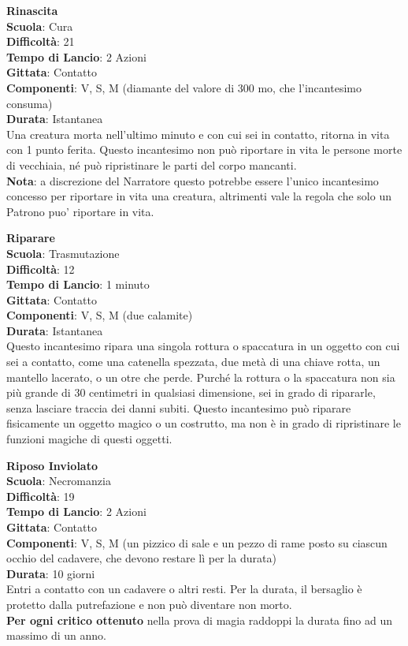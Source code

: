 \begin{multicols}{2}
\medskip\textbf{Rinascita}\\
\textbf{Scuola}: Cura\\
\textbf{Difficoltà}: 21\\
\textbf{Tempo di Lancio}: 2 Azioni\\
\textbf{Gittata}: Contatto\\
\textbf{Componenti}: V, S, M (diamante del valore di 300 mo, che l'incantesimo consuma)\\
\textbf{Durata}: Istantanea\\
Una creatura morta nell'ultimo minuto e con cui sei in contatto, ritorna in vita con 1 punto ferita. Questo incantesimo non può riportare in vita le persone morte di vecchiaia, né può ripristinare le parti del corpo mancanti.\\
\textbf{Nota}: a discrezione del Narratore questo potrebbe essere l'unico incantesimo concesso per riportare in vita una creatura, altrimenti vale la regola che solo un Patrono puo' riportare in vita.

\medskip\textbf{Riparare}\\
\textbf{Scuola}: Trasmutazione\\
\textbf{Difficoltà}: 12\\
\textbf{Tempo di Lancio}: 1 minuto\\
\textbf{Gittata}: Contatto\\
\textbf{Componenti}: V, S, M (due calamite)\\
\textbf{Durata}: Istantanea\\
Questo incantesimo ripara una singola rottura o spaccatura in un oggetto con cui sei a contatto, come una catenella spezzata, due metà di una chiave rotta, un mantello lacerato, o un otre che perde. Purché la rottura o la spaccatura non sia più grande di 30 centimetri in qualsiasi dimensione, sei in grado di ripararle, senza lasciare traccia dei danni subiti. Questo incantesimo può riparare fisicamente un oggetto magico o un costrutto, ma non è in grado di ripristinare le funzioni magiche di questi oggetti.

\medskip\textbf{Riposo Inviolato}\\
\textbf{Scuola}: Necromanzia\\
\textbf{Difficoltà}: 19\\
\textbf{Tempo di Lancio}: 2 Azioni\\
\textbf{Gittata}: Contatto\\
\textbf{Componenti}: V, S, M (un pizzico di sale e un pezzo di rame posto su ciascun occhio del cadavere, che devono restare lì per la durata)\\
\textbf{Durata}: 10 giorni\\
Entri a contatto con un cadavere o altri resti. Per la durata, il bersaglio è protetto dalla putrefazione e non può diventare non morto. \\
\textbf{Per ogni critico ottenuto} nella prova di magia raddoppi la durata fino ad un massimo di un anno.


\end{multicols}
